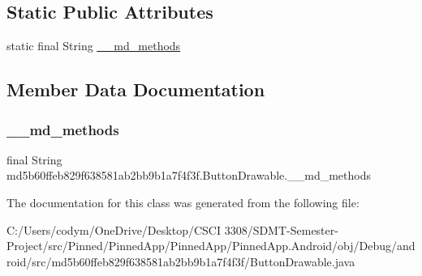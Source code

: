 \subsection*{Static Public Attributes}
\begin{DoxyCompactItemize}
\item 
static final String \hyperlink{classmd5b60ffeb829f638581ab2bb9b1a7f4f3f_1_1_button_drawable_aa04b94d1936232b4a6afd49d724c48c0}{\+\_\+\+\_\+md\+\_\+methods}
\end{DoxyCompactItemize}


\subsection{Member Data Documentation}
\mbox{\label{classmd5b60ffeb829f638581ab2bb9b1a7f4f3f_1_1_button_drawable_aa04b94d1936232b4a6afd49d724c48c0}} 
\subsubsection{\texorpdfstring{\+\_\+\+\_\+md\+\_\+methods}{\_\_md\_methods}}
{\footnotesize\ttfamily final String md5b60ffeb829f638581ab2bb9b1a7f4f3f.\+Button\+Drawable.\+\_\+\+\_\+md\+\_\+methods\hspace{0.3cm}{\ttfamily [static]}}



The documentation for this class was generated from the following file\+:\begin{DoxyCompactItemize}
\item 
C\+:/\+Users/codym/\+One\+Drive/\+Desktop/\+C\+S\+C\+I 3308/\+S\+D\+M\+T-\/\+Semester-\/\+Project/src/\+Pinned/\+Pinned\+App/\+Pinned\+App/\+Pinned\+App.\+Android/obj/\+Debug/android/src/md5b60ffeb829f638581ab2bb9b1a7f4f3f/Button\+Drawable.\+java\end{DoxyCompactItemize}
